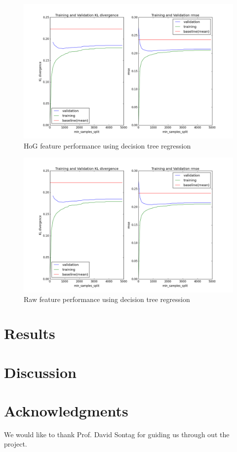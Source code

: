 \documentclass[10pt]{article}
\begin{document}
\begin{figure}
\begin{center}
\includegraphics[scale=0.4]{images/HoG_DecisionTreeCV.png}
\caption{HoG feature performance using decision tree regression}
\label{fig:hogdreval}
\end{center}
\end{figure}

\begin{figure}
\begin{center}
\includegraphics[scale=0.4]{images/HoG_DecisionTreeCV.png}
\caption{Raw feature performance using decision tree regression}
\label{fig:rawdreval}
\end{center}
\end{figure}

\section*{Results}



\section*{Discussion}

\section*{Acknowledgments}

We would like to thank Prof. David Sontag for guiding us through out the project.


\end{document}
